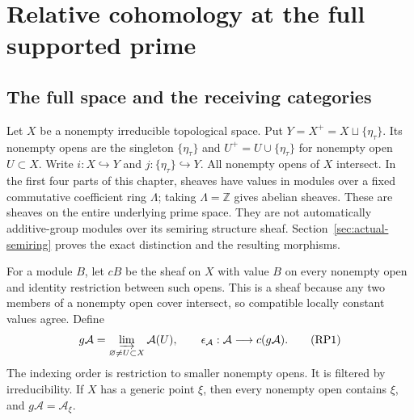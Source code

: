 \section{Relative cohomology at the full supported prime}\label{sec:relative-prime-recollement}


\subsection{The full space and the receiving categories}

Let $X$ be a nonempty irreducible topological space. Put
$Y=X^+=X\sqcup\{\eta_\tau\}$. Its nonempty opens are the singleton
$\{\eta_\tau\}$ and $U^+=U\cup\{\eta_\tau\}$ for nonempty open
$U\subset X$. Write $i:X\hookrightarrow Y$ and
$j:\{\eta_\tau\}\hookrightarrow Y$. All nonempty opens of $X$ intersect.
In the first four parts of this chapter, sheaves have values in modules over a fixed commutative
coefficient ring $\Lambda$; taking $\Lambda=\mathbb Z$ gives abelian
sheaves. These are sheaves on the entire underlying prime space.
They are not automatically additive-group modules over its semiring
structure sheaf. Section~\ref{sec:actual-semiring} proves the exact
distinction and the resulting morphisms.

For a module $B$, let $cB$ be the sheaf on $X$ with value $B$ on every
nonempty open and identity restriction between such opens. This is a
sheaf because any two members of a nonempty open cover intersect, so
compatible locally constant values agree. Define
\[
 g\mathcal A=\varinjlim_{\varnothing\ne U\subset X}\mathcal A(U),
 \qquad \epsilon_{\mathcal A}:\mathcal A\longrightarrow c(g\mathcal A).
 \tag{RP1}\label{eq:generic-functor}
\]
The indexing order is restriction to smaller nonempty opens. It is
filtered by irreducibility. If $X$ has a generic point $\xi$, then every
nonempty open contains $\xi$, and $g\mathcal A=\mathcal A_\xi$.

